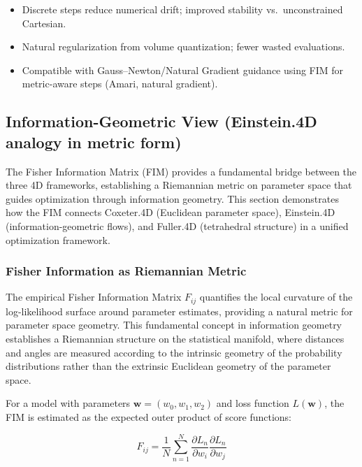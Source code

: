 \documentclass[
  10pt,
]{article}
\providecommand{\tightlist}{%
  \setlength{\itemsep}{0pt}\setlength{\parskip}{0pt}}
\begin{document}
\begin{itemize}
\tightlist
\item
  Discrete steps reduce numerical drift; improved stability
  vs.~unconstrained Cartesian.
\item
  Natural regularization from volume quantization; fewer wasted
  evaluations.
\item
  Compatible with Gauss--Newton/Natural Gradient guidance using FIM for
  metric-aware steps (Amari, natural gradient).
\end{itemize}

\hypertarget{information-geometric-view-einstein.4d-analogy-in-metric-form}{%
\subsection{Information-Geometric View (Einstein.4D analogy in metric
form)}\label{information-geometric-view-einstein.4d-analogy-in-metric-form}}

The Fisher Information Matrix (FIM) provides a fundamental bridge
between the three 4D frameworks, establishing a Riemannian metric on
parameter space that guides optimization through information geometry.
This section demonstrates how the FIM connects Coxeter.4D (Euclidean
parameter space), Einstein.4D (information-geometric flows), and
Fuller.4D (tetrahedral structure) in a unified optimization framework.

\hypertarget{fisher-information-as-riemannian-metric}{%
\subsubsection{Fisher Information as Riemannian
Metric}\label{fisher-information-as-riemannian-metric}}

The empirical Fisher Information Matrix \(F_{ij}\) quantifies the local
curvature of the log-likelihood surface around parameter estimates,
providing a natural metric for parameter space geometry. This
fundamental concept in information geometry establishes a Riemannian
structure on the statistical manifold, where distances and angles are
measured according to the intrinsic geometry of the probability
distributions rather than the extrinsic Euclidean geometry of the
parameter space.

For a model with parameters \(\mathbf{w} = (w_0, w_1, w_2)\) and loss
function \(L(\mathbf{w})\), the FIM is estimated as the expected outer
product of score functions:

\begin{equation}\label{eq:fim_empirical}
F_{ij} = \frac{1}{N}\sum_{n=1}^N \frac{\partial L_n}{\partial w_i} \frac{\partial L_n}{\partial w_j}
\end{equation}
\end{document}
